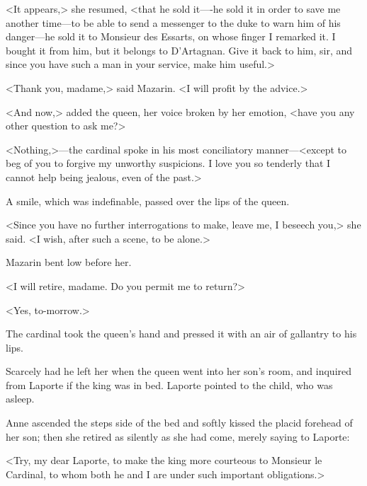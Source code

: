 <It appears,> she resumed, <that he sold it—-he sold it in order to save me another time—to be able to send a messenger to the duke to warn him of his danger—he sold it to Monsieur des Essarts, on whose finger I remarked it. I bought it from him, but it belongs to D'Artagnan. Give it back to him, sir, and since you have such a man in your service, make him useful.>

<Thank you, madame,> said Mazarin. <I will profit by the advice.>

<And now,> added the queen, her voice broken by her emotion, <have you any other question to ask me?>

<Nothing,>—the cardinal spoke in his most conciliatory manner—<except to beg of you to forgive my unworthy suspicions. I love you so tenderly that I cannot help being jealous, even of the past.>

A smile, which was indefinable, passed over the lips of the queen.

<Since you have no further interrogations to make, leave me, I beseech you,> she said. <I wish, after such a scene, to be alone.>

Mazarin bent low before her.

<I will retire, madame. Do you permit me to return?>

<Yes, to-morrow.>

The cardinal took the queen's hand and pressed it with an air of gallantry to his lips.

Scarcely had he left her when the queen went into her son's room, and inquired from Laporte if the king was in bed. Laporte pointed to the child, who was asleep.

Anne ascended the steps side of the bed and softly kissed the placid forehead of her son; then she retired as silently as she had come, merely saying to Laporte:

<Try, my dear Laporte, to make the king more courteous to Monsieur le Cardinal, to whom both he and I are under such important obligations.> 